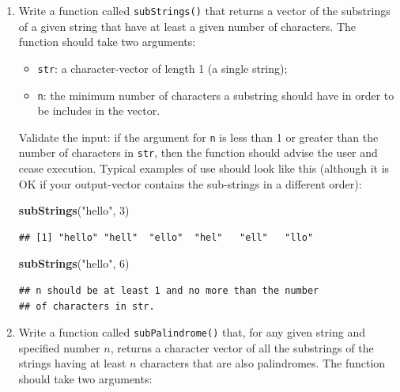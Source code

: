\documentclass[]{book}
\makeatletter
\newenvironment{Shaded}{\begin{snugshade}}{\end{snugshade}}
\newcommand{\KeywordTok}[1]{\textcolor[rgb]{0.13,0.29,0.53}{\textbf{#1}}}
\newcommand{\DecValTok}[1]{\textcolor[rgb]{0.00,0.00,0.81}{#1}}
\newcommand{\StringTok}[1]{\textcolor[rgb]{0.31,0.60,0.02}{#1}}
\newcommand{\NormalTok}[1]{#1}
\providecommand{\tightlist}{%
  \setlength{\itemsep}{0pt}\setlength{\parskip}{0pt}}
\newenvironment{kframe}{%
\medskip{}
\setlength{\fboxsep}{.8em}
 \def\at@end@of@kframe{}%
 \ifinner\ifhmode%
  \def\at@end@of@kframe{\end{minipage}}%
  \begin{minipage}{\columnwidth}%
 \fi\fi%
 \def\FrameCommand##1{\hskip\@totalleftmargin \hskip-\fboxsep
 \colorbox{shadecolor}{##1}\hskip-\fboxsep
     \hskip-\linewidth \hskip-\@totalleftmargin \hskip\columnwidth}%
 \MakeFramed {\advance\hsize-\width
   \@totalleftmargin\z@ \linewidth\hsize
   \@setminipage}}%
 {\par\unskip\endMakeFramed%
 \at@end@of@kframe}
\renewenvironment{Shaded}{\begin{kframe}}{\end{kframe}}
\theoremstyle{definition}
\theoremstyle{definition}
\theoremstyle{definition}
\theoremstyle{remark}
\makeatother
\begin{document}
{\begin{enumerate}
\begin{verbatim}
## [1] FALSE
\end{verbatim}
\item
  Write a function called \texttt{subStrings()} that returns a vector of
  the substrings of a given string that have at least a given number of
  characters. The function should take two arguments:

  \begin{itemize}
  \tightlist
  \item
    \texttt{str}: a character-vector of length 1 (a single string);
  \item
    \texttt{n}: the minimum number of characters a substring should have
    in order to be includes in the vector.
  \end{itemize}

  Validate the input: if the argument for \texttt{n} is less than 1 or
  greater than the number of characters in \texttt{str}, then the
  function should advise the user and cease execution. Typical examples
  of use should look like this (although it is OK if your output-vector
  contains the sub-strings in a different order):

\begin{Shaded}
\begin{Highlighting}[]
\KeywordTok{subStrings}\NormalTok{(}\StringTok{"hello"}\NormalTok{, }\DecValTok{3}\NormalTok{)}
\end{Highlighting}
\end{Shaded}

\begin{verbatim}
## [1] "hello" "hell"  "ello"  "hel"   "ell"   "llo"
\end{verbatim}

\begin{Shaded}
\begin{Highlighting}[]
\KeywordTok{subStrings}\NormalTok{(}\StringTok{"hello"}\NormalTok{, }\DecValTok{6}\NormalTok{)}
\end{Highlighting}
\end{Shaded}

\begin{verbatim}
## n should be at least 1 and no more than the number
## of characters in str.
\end{verbatim}
\item
  Write a function called \texttt{subPalindrome()} that, for any given
  string and specified number \(n\), returns a character vector of all
  the substrings of the strings having at least \(n\) characters that
  are also palindromes. The function should take two arguments:


\end{enumerate}}
\end{document}
